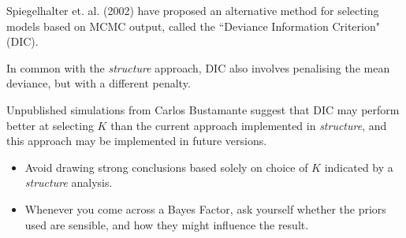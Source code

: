 


Spiegelhalter et. al. (2002) have proposed an alternative method
for selecting models based on MCMC output, called the ``Deviance
Information Criterion" (DIC).

In common with the {\sl structure} approach, DIC also
involves penalising the mean deviance, but with a different penalty.

Unpublished simulations from Carlos Bustamante suggest that DIC may
perform better at selecting $K$ than the current approach implemented
in {\sl structure}, and this approach may be implemented in future versions.


%





%

%




\begin{itemize}
\item Avoid drawing strong conclusions based solely on
choice of $K$ indicated by a {\sl structure} analysis.
\item Whenever you come across a Bayes Factor, ask yourself whether the priors
used are sensible, and how they might influence the result.
\end{itemize}


